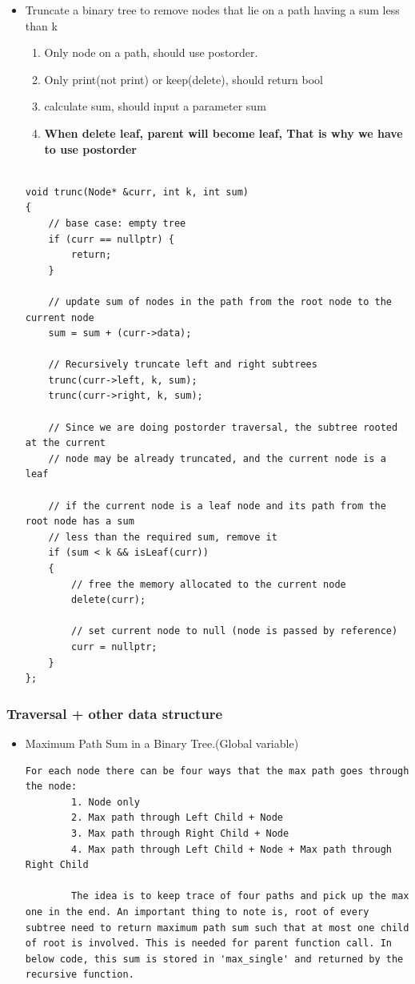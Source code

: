 \documentclass[a4paper,11pt,twoside]{book}
\begin{document}
\begin{itemize}
\item Truncate a binary tree to remove nodes that lie on a path having a sum less than k
\begin{enumerate}
	\item Only node on a path, should use postorder. 
	\item Only print(not print) or keep(delete), should return bool
	\item calculate sum, should input a parameter sum
	\item \textbf{When delete leaf, parent will become leaf, That is why we have to use postorder}
\end{enumerate}
\begin{lstlisting}
	
void trunc(Node* &curr, int k, int sum)
{
	// base case: empty tree
	if (curr == nullptr) {
		return;
	}
	
	// update sum of nodes in the path from the root node to the current node
	sum = sum + (curr->data);
	
	// Recursively truncate left and right subtrees
	trunc(curr->left, k, sum);
	trunc(curr->right, k, sum);
	
	// Since we are doing postorder traversal, the subtree rooted at the current
	// node may be already truncated, and the current node is a leaf
	
	// if the current node is a leaf node and its path from the root node has a sum
	// less than the required sum, remove it
	if (sum < k && isLeaf(curr))
	{
		// free the memory allocated to the current node
		delete(curr);
		
		// set current node to null (node is passed by reference)
		curr = nullptr;
	}
};
\end{lstlisting}



\end{itemize}

\subsubsection{Traversal + other data structure}
\begin{itemize}
	\item Maximum Path Sum in a Binary Tree.(Global variable)
	\begin{lstlisting}[breaklines]
		For each node there can be four ways that the max path goes through the node:
		1. Node only
		2. Max path through Left Child + Node
		3. Max path through Right Child + Node
		4. Max path through Left Child + Node + Max path through Right Child
		
		The idea is to keep trace of four paths and pick up the max one in the end. An important thing to note is, root of every subtree need to return maximum path sum such that at most one child of root is involved. This is needed for parent function call. In below code, this sum is stored in 'max_single' and returned by the recursive function.
	\end{lstlisting}
\end{itemize}
\end{document}
